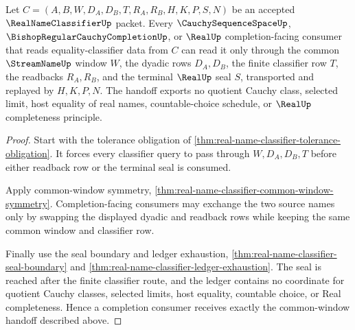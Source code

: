 \begin{theorem}
\label{thm:realnameclassifier-common-window-cauchy-completion-handoff}
Let $C=(A,B,W,D_A,D_B,T,R_A,R_B,H,K,P,S,N)$ be an accepted $\RealNameClassifierUp$ packet. Every $\CauchySequenceSpaceUp$, $\BishopRegularCauchyCompletionUp$, or $\RealUp$ completion-facing consumer that reads equality-classifier data from $C$ can read it only through the common $\StreamNameUp$ window $W$, the dyadic rows $D_A,D_B$, the finite classifier row $T$, the readbacks $R_A,R_B$, and the terminal $\RealUp$ seal $S$, transported and replayed by $H,K,P,N$. The handoff exports no quotient Cauchy class, selected limit, host equality of real names, countable-choice schedule, or $\RealUp$ completeness principle.
\end{theorem}
\begin{proof}
Start with the tolerance obligation of \autoref{thm:real-name-classifier-tolerance-obligation}. It forces every classifier query to pass through $W,D_A,D_B,T$ before either readback row or the terminal seal is consumed.

Apply common-window symmetry, \autoref{thm:real-name-classifier-common-window-symmetry}. Completion-facing consumers may exchange the two source names only by swapping the displayed dyadic and readback rows while keeping the same common window and classifier row.

Finally use the seal boundary and ledger exhaustion, \autoref{thm:real-name-classifier-seal-boundary} and \autoref{thm:real-name-classifier-ledger-exhaustion}. The seal is reached after the finite classifier route, and the ledger contains no coordinate for quotient Cauchy classes, selected limits, host equality, countable choice, or Real completeness. Hence a completion consumer receives exactly the common-window handoff described above.
\end{proof}

